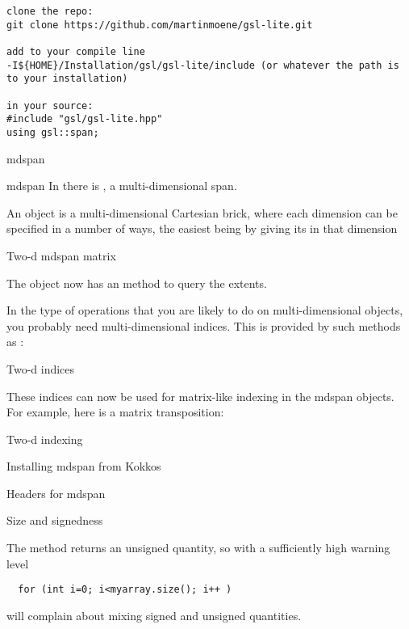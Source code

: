\begin{verbatim}
clone the repo: 
git clone https://github.com/martinmoene/gsl-lite.git

add to your compile line 
-I${HOME}/Installation/gsl/gsl-lite/include (or whatever the path is to your installation)

in your source:
#include "gsl/gsl-lite.hpp"
using gsl::span;
\end{verbatim}

 {mdspan}

\begin{plainblock}{mdspan}
  In  there is ,
  a multi-dimensional span.
\end{plainblock}

An  object is a multi-dimensional Cartesian brick,
where each dimension can be specified in a number of ways,
the easiest being by giving its  in that dimension

\begin{block}{Two-d mdspan matrix}
\end{block}

The object now has an  method to query the extents.

In the type of operations that you are likely to do on multi-dimensional objects,
you probably need multi-dimensional indices.
This is provided by such methods as :

\begin{block}{Two-d indices}
\end{block}

These indices can now be used for matrix-like indexing in the mdspan objects.
For example, here is a matrix transposition:

\begin{block}{Two-d indexing}
\end{block}

 {Installing mdspan from Kokkos}

\begin{block}{Headers for mdspan}
\end{block}

 {Size and signedness}

The  method returns an unsigned quantity,
so with a sufficiently high warning level
\begin{lstlisting}
  for (int i=0; i<myarray.size(); i++ )
\end{lstlisting}
will complain about mixing signed and unsigned quantities.


